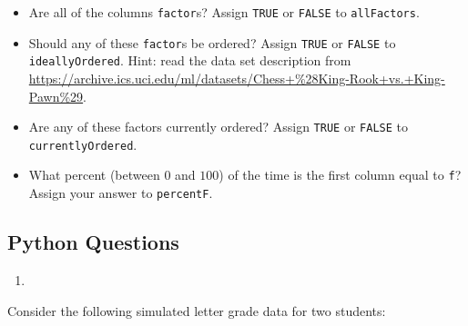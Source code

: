 \documentclass[
  12pt,
]{krantz}
\providecommand{\tightlist}{%
  \setlength{\itemsep}{0pt}\setlength{\parskip}{0pt}}
\begin{document}
\begin{itemize}
\tightlist
\item
  Are all of the columns \texttt{factor}s? Assign \texttt{TRUE} or \texttt{FALSE} to \texttt{allFactors}.
\item
  Should any of these \texttt{factor}s be ordered? Assign \texttt{TRUE} or \texttt{FALSE} to \texttt{ideallyOrdered}. Hint: read the data set description from \url{https://archive.ics.uci.edu/ml/datasets/Chess+\%28King-Rook+vs.+King-Pawn\%29}.
\item
  Are any of these factors currently ordered? Assign \texttt{TRUE} or \texttt{FALSE} to \texttt{currentlyOrdered}.
\item
  What percent (between \(0\) and \(100\)) of the time is the first column equal to \texttt{\textquotesingle{}f\textquotesingle{}}? Assign your answer to \texttt{percentF}.
\end{itemize}

\hypertarget{python-questions-5}{%
\subsection{Python Questions}\label{python-questions-5}}

\begin{enumerate}
\def\labelenumi{\arabic{enumi}.}
\tightlist
\item
\end{enumerate}

Consider the following simulated letter grade data for two students:
\end{document}
